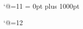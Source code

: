 \catcode`@=11
\newskip\@centering
\@centering = 0pt plus 1000pt
\newcount\@eqcnt
\def\@eqncr{& \eqsubmark\cr}
\def\@@eqncr{& \eqsubmark\cr}
\def\m@th{\mathsurround\z@}
\def\numcases#1{$$%
 \setbox\z@\hbox{ %
  $\displaystyle {#1}\m@th\mskip\medmuskip$}%
\dimen@ii\displaywidth
\setbox\tw@\vbox\bgroup
 \tabskip\@centering\let\\\@eqncr
 \halign to\dimen@ii
 \bgroup
   \kern\wd\z@ \kern13\p@ \global\@eqcnt\@ne$\displaystyle\tabskip\z@{##}$\hfil 
   &\global\@eqcnt\tw@ \quad ##\unskip \hfil\tabskip\@centering
   &\llap{##}\tabskip\z@\cr}

\def\endnumcases{\@@eqncr
 \egroup %
 \setbox\z@\lastbox \nointerlineskip \copy\z@ %
 \g@tboxedwidth\z@ %
\egroup%
\hbox to\displaywidth{%
 \hskip\@centering \hbox to\dimen@i{$\displaystyle \box\z@ %
  \dimen@\ht\tw@ \advance\dimen@\dp\tw@ %
  \left\{\vcenter to\dimen@{\vfil}\right.\n@space %
  $\hfil}\hskip\@centering %
 \kern-\displaywidth $\vcenter{\box\tw@}$%
}%
\global\dsubnum=0
$$}

\def\g@tboxedwidth#1{\setbox#1\hbox{\unhbox#1\global\dimen@i\z@ 
  \G@tBoxedWidth}}
\def\G@tBoxedWidth{\unskip\unskip\unskip \setbox\z@\lastbox 
 \ifvoid\z@\else \global\advance\dimen@i\wd\z@ \expandafter\G@tBoxedWidth \fi}
\catcode`@=12

%

